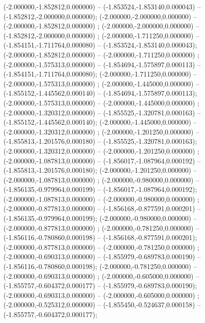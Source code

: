  (-2.000000,-1.852812,0.000000) -- (-1.853524,-1.853140,0.000043) -- (-1.852812,-2.000000,0.000000);
 (-2.000000,-2.000000,0.000000) -- (-2.000000,-1.852812,0.000000) ;
 (-2.000000,-2.000000,0.000000) -- (-1.852812,-2.000000,0.000000) ;
 (-2.000000,-1.711250,0.000000) -- (-1.854151,-1.711764,0.000080) -- (-1.853524,-1.853140,0.000043);
 (-2.000000,-1.852812,0.000000) -- (-2.000000,-1.711250,0.000000) ;
 (-2.000000,-1.575313,0.000000) -- (-1.854694,-1.575897,0.000113) -- (-1.854151,-1.711764,0.000080);
 (-2.000000,-1.711250,0.000000) -- (-2.000000,-1.575313,0.000000) ;
 (-2.000000,-1.445000,0.000000) -- (-1.855152,-1.445562,0.000140) -- (-1.854694,-1.575897,0.000113);
 (-2.000000,-1.575313,0.000000) -- (-2.000000,-1.445000,0.000000) ;
 (-2.000000,-1.320312,0.000000) -- (-1.855525,-1.320781,0.000163) -- (-1.855152,-1.445562,0.000140);
 (-2.000000,-1.445000,0.000000) -- (-2.000000,-1.320312,0.000000) ;
 (-2.000000,-1.201250,0.000000) -- (-1.855813,-1.201576,0.000180) -- (-1.855525,-1.320781,0.000163);
 (-2.000000,-1.320312,0.000000) -- (-2.000000,-1.201250,0.000000) ;
 (-2.000000,-1.087813,0.000000) -- (-1.856017,-1.087964,0.000192) -- (-1.855813,-1.201576,0.000180);
 (-2.000000,-1.201250,0.000000) -- (-2.000000,-1.087813,0.000000) ;
 (-2.000000,-0.980000,0.000000) -- (-1.856135,-0.979964,0.000199) -- (-1.856017,-1.087964,0.000192);
 (-2.000000,-1.087813,0.000000) -- (-2.000000,-0.980000,0.000000) ;
 (-2.000000,-0.877813,0.000000) -- (-1.856168,-0.877591,0.000201) -- (-1.856135,-0.979964,0.000199);
 (-2.000000,-0.980000,0.000000) -- (-2.000000,-0.877813,0.000000) ;
 (-2.000000,-0.781250,0.000000) -- (-1.856116,-0.780860,0.000198) -- (-1.856168,-0.877591,0.000201);
 (-2.000000,-0.877813,0.000000) -- (-2.000000,-0.781250,0.000000) ;
 (-2.000000,-0.690313,0.000000) -- (-1.855979,-0.689783,0.000190) -- (-1.856116,-0.780860,0.000198);
 (-2.000000,-0.781250,0.000000) -- (-2.000000,-0.690313,0.000000) ;
 (-2.000000,-0.605000,0.000000) -- (-1.855757,-0.604372,0.000177) -- (-1.855979,-0.689783,0.000190);
 (-2.000000,-0.690313,0.000000) -- (-2.000000,-0.605000,0.000000) ;
 (-2.000000,-0.525312,0.000000) -- (-1.855450,-0.524637,0.000158) -- (-1.855757,-0.604372,0.000177);
